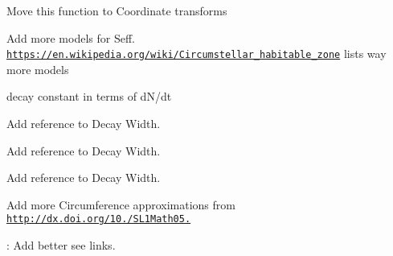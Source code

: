
\begin{DoxyRefList}
\item[\label{todo__todo000007}%
\Hypertarget{todo__todo000007}%
Member \mbox{\hyperlink{group___e_g_x_math-_conversions-_coordinate_conversions-3_d-_spherical_gaa9b50c4837e1cbea569de6f7bc90a3b6}{E\+G\+X\+Math\+:\+:Spherical\+Cordinates\+Of\+Point\+Given\+Center}} (const T centerR, const T center\+Azimuth\+In\+Radians, const T center\+Zenith\+In\+Radians, const T pointR, const T point\+Azimuth\+In\+Radians, const T poin\+Zenith\+In\+Radians, T \&shiftedR, T \&shifted\+Azimuth\+In\+Radians, T \&shifted\+Zenith\+In\+Radians)]Move this function to Coordinate transforms  
\item[\label{todo__todo000001}%
\Hypertarget{todo__todo000001}%
Module \mbox{\hyperlink{group___e_g_x_phys-_circumstellar_habitable_zone_limit}{E\+G\+X\+Phys-\/\+Circumstellar\+Habitable\+Zone\+Limit}} ]Add more models for Seff. \href{https://en.wikipedia.org/wiki/Circumstellar_habitable_zone}{\tt https\+://en.\+wikipedia.\+org/wiki/\+Circumstellar\+\_\+habitable\+\_\+zone} lists way more models  
\item[\label{todo__todo000002}%
\Hypertarget{todo__todo000002}%
Module \mbox{\hyperlink{group___e_g_x_phys-_decay_constant}{E\+G\+X\+Phys-\/\+Decay\+Constant}} ]decay constant in terms of d\+N/dt  
\item[\label{todo__todo000003}%
\Hypertarget{todo__todo000003}%
Module \mbox{\hyperlink{group___e_g_x_phys-_half_life}{E\+G\+X\+Phys-\/\+Half\+Life}} ]Add reference to Decay Width.  
\item[\label{todo__todo000004}%
\Hypertarget{todo__todo000004}%
Module \mbox{\hyperlink{group___e_g_x_phys-_nuclear_binding_energy}{E\+G\+X\+Phys-\/\+Nuclear\+Binding\+Energy}} ]Add reference to Decay Width.  
\item[\label{todo__todo000006}%
\Hypertarget{todo__todo000006}%
Module \mbox{\hyperlink{group___e_g_x_phys-_semi_empirical_mass_formula}{E\+G\+X\+Phys-\/\+Semi\+Empirical\+Mass\+Formula}} ]Add reference to Decay Width.  
\item[\label{todo__todo000008}%
\Hypertarget{todo__todo000008}%
File \mbox{\hyperlink{_ellipse_circumference_8hpp}{Ellipse\+Circumference.hpp}} ]Add more Circumference approximations from \href{http://dx.doi.org/10.3247/SL1Math05.004}{\tt http\+://dx.\+doi.\+org/10./\+S\+L1\+Math05.}  
\item[\label{todo__todo000005}%
\Hypertarget{todo__todo000005}%
File \mbox{\hyperlink{_nuclear_separation_energy_8hpp}{Nuclear\+Separation\+Energy.hpp}} ]\+: Add better see links. 
\end{DoxyRefList}